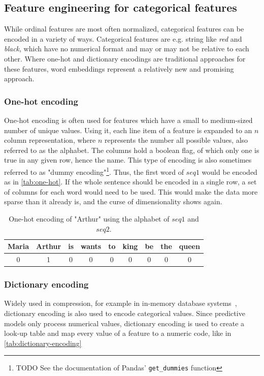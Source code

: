 \subsection{Feature engineering for categorical features}
\label{sec:categorical-feature-engineering}
While ordinal features are most often normalized, categorical features can be encoded in a variety of ways. Categorical features are e.g. string like \textit{red} and \textit{black}, which have no numerical format and may or may not be relative to each other. Where one-hot and dictionary encodings are traditional approaches for these features, word embeddings represent a relatively new and promising approach.

\subsubsection*{One-hot encoding}
One-hot encoding is often used for features which have a small to medium-sized number of unique values. Using it, each line item of a feature is expanded to an $n$ column representation, where $n$ represents the number all possible values, also referred to as the alphabet. The columns hold a boolean flag, of which only one is true in any given row, hence the name. This type of encoding is also sometimes referred to as "dummy encoding"\footnote{TODO See the documentation of Pandas' \texttt{get\_dummies} function}. Thus, the first word of $seq1$ would be encoded as in \autoref{tab:one-hot}. If the whole sentence should be encoded in a single row, a set of columns for each word would need to be used. This would make the data more sparse than it already is, and the curse of dimensionality shows again.

\begin{table}[ht]
    \centering
    \begin{tabular}{c|c|c|c|c|c|c|c|c}
        Maria & Arthur & is & wants & to & king & be & the & queen\\
        \hline
        0 & 1 & 0 & 0 & 0 & 0 & 0 & 0 & 0\\
    \end{tabular}
    \caption{One-hot encoding of "Arthur" using the alphabet of $seq1$ and $seq2$.}
    \label{tab:one-hot}
\end{table}

\subsubsection*{Dictionary encoding}
Widely used in compression, for example in in-memory database systems~\cite{plattner2012memory}, dictionary encoding is also used to encode categorical values. Since predictive models only process numerical values, dictionary encoding is used to create a look-up table and map every value of a feature to a numeric code, like in \autoref{tab:dictionary-encoding}

